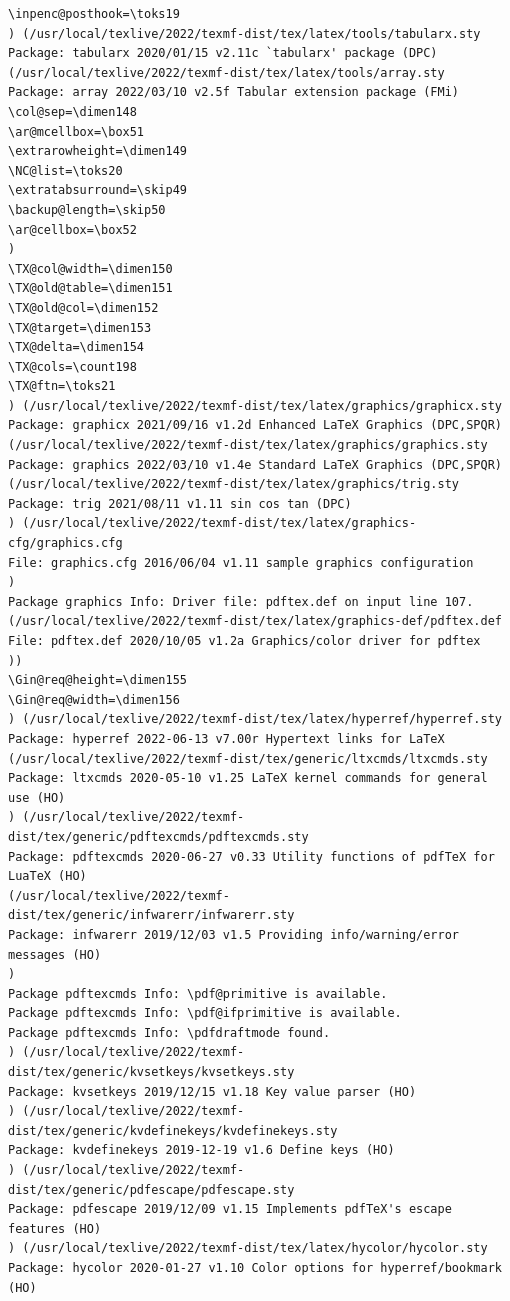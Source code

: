 \documentclass{article}
\begin{document}
\begin{verbatim}
\inpenc@posthook=\toks19
) (/usr/local/texlive/2022/texmf-dist/tex/latex/tools/tabularx.sty
Package: tabularx 2020/01/15 v2.11c `tabularx' package (DPC)
(/usr/local/texlive/2022/texmf-dist/tex/latex/tools/array.sty
Package: array 2022/03/10 v2.5f Tabular extension package (FMi)
\col@sep=\dimen148
\ar@mcellbox=\box51
\extrarowheight=\dimen149
\NC@list=\toks20
\extratabsurround=\skip49
\backup@length=\skip50
\ar@cellbox=\box52
)
\TX@col@width=\dimen150
\TX@old@table=\dimen151
\TX@old@col=\dimen152
\TX@target=\dimen153
\TX@delta=\dimen154
\TX@cols=\count198
\TX@ftn=\toks21
) (/usr/local/texlive/2022/texmf-dist/tex/latex/graphics/graphicx.sty
Package: graphicx 2021/09/16 v1.2d Enhanced LaTeX Graphics (DPC,SPQR)
(/usr/local/texlive/2022/texmf-dist/tex/latex/graphics/graphics.sty
Package: graphics 2022/03/10 v1.4e Standard LaTeX Graphics (DPC,SPQR)
(/usr/local/texlive/2022/texmf-dist/tex/latex/graphics/trig.sty
Package: trig 2021/08/11 v1.11 sin cos tan (DPC)
) (/usr/local/texlive/2022/texmf-dist/tex/latex/graphics-cfg/graphics.cfg
File: graphics.cfg 2016/06/04 v1.11 sample graphics configuration
)
Package graphics Info: Driver file: pdftex.def on input line 107.
(/usr/local/texlive/2022/texmf-dist/tex/latex/graphics-def/pdftex.def
File: pdftex.def 2020/10/05 v1.2a Graphics/color driver for pdftex
))
\Gin@req@height=\dimen155
\Gin@req@width=\dimen156
) (/usr/local/texlive/2022/texmf-dist/tex/latex/hyperref/hyperref.sty
Package: hyperref 2022-06-13 v7.00r Hypertext links for LaTeX
(/usr/local/texlive/2022/texmf-dist/tex/generic/ltxcmds/ltxcmds.sty
Package: ltxcmds 2020-05-10 v1.25 LaTeX kernel commands for general use (HO)
) (/usr/local/texlive/2022/texmf-dist/tex/generic/pdftexcmds/pdftexcmds.sty
Package: pdftexcmds 2020-06-27 v0.33 Utility functions of pdfTeX for LuaTeX (HO)
(/usr/local/texlive/2022/texmf-dist/tex/generic/infwarerr/infwarerr.sty
Package: infwarerr 2019/12/03 v1.5 Providing info/warning/error messages (HO)
)
Package pdftexcmds Info: \pdf@primitive is available.
Package pdftexcmds Info: \pdf@ifprimitive is available.
Package pdftexcmds Info: \pdfdraftmode found.
) (/usr/local/texlive/2022/texmf-dist/tex/generic/kvsetkeys/kvsetkeys.sty
Package: kvsetkeys 2019/12/15 v1.18 Key value parser (HO)
) (/usr/local/texlive/2022/texmf-dist/tex/generic/kvdefinekeys/kvdefinekeys.sty
Package: kvdefinekeys 2019-12-19 v1.6 Define keys (HO)
) (/usr/local/texlive/2022/texmf-dist/tex/generic/pdfescape/pdfescape.sty
Package: pdfescape 2019/12/09 v1.15 Implements pdfTeX's escape features (HO)
) (/usr/local/texlive/2022/texmf-dist/tex/latex/hycolor/hycolor.sty
Package: hycolor 2020-01-27 v1.10 Color options for hyperref/bookmark (HO)

\end{verbatim}
\end{document}
